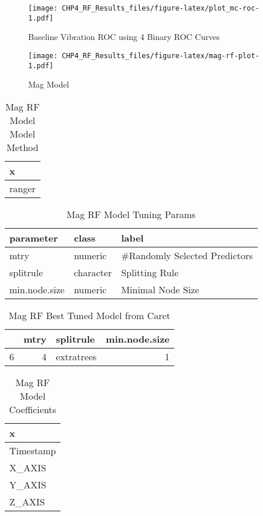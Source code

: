 \documentclass[]{article}
\begin{document}
\begin{figure}
\centering
\texttt{[image: CHP4\_RF\_Results\_files/figure-latex/plot\_mc-roc-1.pdf]}
\caption{Baseline Vibration ROC using 4 Binary ROC Curves}
\end{figure}

\begin{figure}
\centering
\texttt{[image: CHP4\_RF\_Results\_files/figure-latex/mag-rf-plot-1.pdf]}
\caption{Mag Model}
\end{figure}

\begin{table}[!h]

\caption{\label{tab:mag-rf-params}Mag RF Model Model Method}
\centering
\begin{tabular}[t]{l}
\toprule
x\\
\midrule
ranger\\
\bottomrule
\end{tabular}
\end{table}

\begin{table}[!h]

\caption{\label{tab:mag-rf-params}Mag RF Model Tuning Params}
\centering
\begin{tabular}[t]{lll}
\toprule
parameter & class & label\\
\midrule
mtry & numeric & \#Randomly Selected Predictors\\
splitrule & character & Splitting Rule\\
min.node.size & numeric & Minimal Node Size\\
\bottomrule
\end{tabular}
\end{table}

\begin{table}[!h]

\caption{\label{tab:mag-rf-params}Mag RF Best Tuned Model from Caret}
\centering
\begin{tabular}[t]{lrlr}
\toprule
  & mtry & splitrule & min.node.size\\
\midrule
6 & 4 & extratrees & 1\\
\bottomrule
\end{tabular}
\end{table}

\begin{table}[!h]

\caption{\label{tab:mag-rf-params}Mag RF Model Coefficients}
\centering
\begin{tabular}[t]{l}
\toprule
x\\
\midrule
Timestamp\\
X\_AXIS\\
Y\_AXIS\\
Z\_AXIS\\
\bottomrule
\end{tabular}
\end{table}
\end{document}
